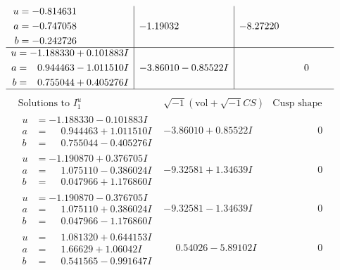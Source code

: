 \documentclass[1p]{elsarticle_modified}
\theoremstyle{definition}
\newcommand{\I}{\sqrt{-1}}
\begin{document}
$$\begin{array}{c|c|c}
\begin{aligned}
u &= -0.814631\phantom{ +0.000000I} \\
a &= -0.747058\phantom{ +0.000000I} \\
b &= -0.242726\phantom{ +0.000000I}\end{aligned}
 & -1.19032\phantom{ +0.000000I} & -8.27220\phantom{ +0.000000I} \\ \hline\begin{aligned}
u &= -1.188330 + 0.101883 I \\
a &= \phantom{-}0.944463 - 1.011510 I \\
b &= \phantom{-}0.755044 + 0.405276 I\end{aligned}
 & -3.86010 - 0.85522 I & \phantom{-0.000000 } 0\\
 \hline 
 \end{array}$$\newpage$$\begin{array}{c|c|c}  
\text{Solutions to }I^u_{1}& \I (\text{vol} + \sqrt{-1}CS) & \text{Cusp shape}\\
 \hline 
\begin{aligned}
u &= -1.188330 - 0.101883 I \\
a &= \phantom{-}0.944463 + 1.011510 I \\
b &= \phantom{-}0.755044 - 0.405276 I\end{aligned}
 & -3.86010 + 0.85522 I & \phantom{-0.000000 } 0 \\ \hline\begin{aligned}
u &= -1.190870 + 0.376705 I \\
a &= \phantom{-}1.075110 - 0.386024 I \\
b &= \phantom{-}0.047966 + 1.176860 I\end{aligned}
 & -9.32581 + 1.34639 I & \phantom{-0.000000 } 0 \\ \hline\begin{aligned}
u &= -1.190870 - 0.376705 I \\
a &= \phantom{-}1.075110 + 0.386024 I \\
b &= \phantom{-}0.047966 - 1.176860 I\end{aligned}
 & -9.32581 - 1.34639 I & \phantom{-0.000000 } 0 \\ \hline\begin{aligned}
u &= \phantom{-}1.081320 + 0.644153 I \\
a &= \phantom{-}1.66629 + 1.06042 I \\
b &= \phantom{-}0.541565 - 0.991647 I\end{aligned}
 & \phantom{-}0.54026 - 5.89102 I & \phantom{-0.000000 } 0 \\ \hline\begin{aligned}

\end{aligned}
\end{array}$$
\end{document}
